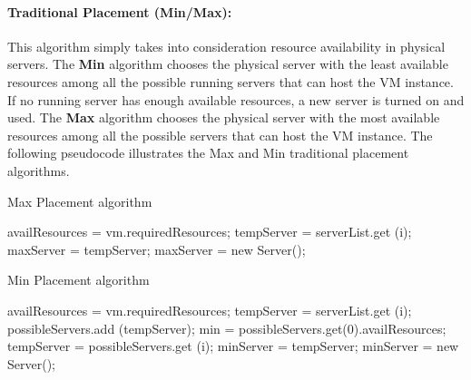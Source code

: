 \documentclass[sigconf]{sigplanconf}
\begin{document}
      \paragraph{Traditional Placement (Min/Max):}
      This algorithm simply takes into consideration resource availability in physical servers. The \textbf{Min} algorithm chooses the physical server with the least available resources among all the possible running servers that can host the VM instance. If no running server has enough available resources, a new server is turned on and used. The \textbf{Max} algorithm chooses the physical server with the most available resources among all the possible servers that can host the VM instance. The following pseudocode illustrates the Max and Min traditional placement algorithms.
      
      \begin{algorithm}  
      	\caption{Max Placement algorithm} 
      	\label{cont_aware}
      	\begin{algorithmic}[5]  
      		\Statex  
      		\State availResources = vm.requiredResources;
      		\State tempServer = serverList.get (i);
      		\State maxServer = tempServer;
      		\EndIf  
      		\EndFor  
      		\State maxServer = new Server();
      		\EndIf
      		\State {}  
      		\EndFunction  
      	\end{algorithmic}  
      \end{algorithm}
      
      \begin{algorithm}  
      	\caption{Min Placement algorithm} 
      	\label{cont_aware}
      	\begin{algorithmic}[5]  
      		\Statex  
      		\State availResources = vm.requiredResources;
      		\State tempServer = serverList.get (i);
      		\State possibleServers.add (tempServer);
      		\EndIf  
      		\EndFor  
      		\State min = possibleServers.get(0).availResources;
      		\State tempServer = possibleServers.get (i);
      		\State minServer = tempServer;
      		\EndIf  
      		\EndFor  
      		\State minServer = new Server();
      		\EndIf
      		\State {}  
      		\EndFunction  
      	\end{algorithmic}  
      \end{algorithm}
    
\end{document}

